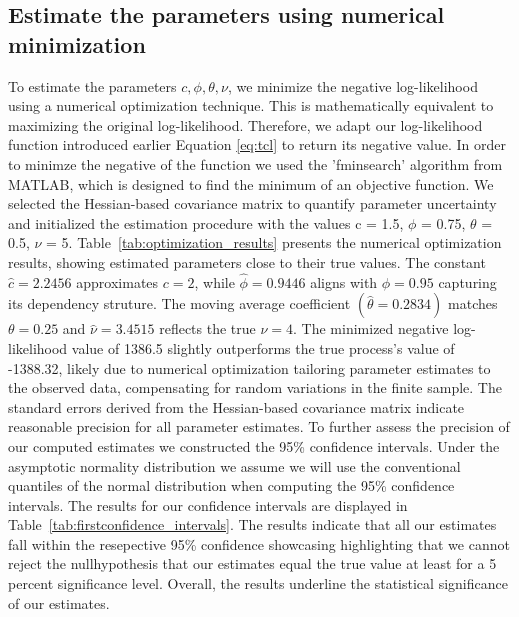 \documentclass[11pt]{article}
\begin{document}
\subsection{Estimate the parameters using numerical minimization}
To estimate the parameters $c, \phi, \theta, \nu$, we minimize the negative log-likelihood using a numerical optimization technique. This is mathematically equivalent to maximizing the original log-likelihood.
Therefore, we adapt our log-likelihood function introduced earlier Equation \eqref{eq:tcl} to return its negative value.
In order to minimze the negative of the function we used the 'fminsearch' algorithm from MATLAB, which is designed to find the minimum of an objective function. 
We selected the Hessian-based covariance matrix to quantify parameter uncertainty and initialized the estimation procedure with the values c = 1.5, $\phi$ = 0.75, $\theta$ = 0.5, $\nu$ = 5.
Table~\ref{tab:optimization_results} presents the numerical optimization results, showing estimated parameters close to their true values.
The constant \(\hat{c} = 2.2456\) approximates \(c = 2\), while \(\hat{\phi}
= 0.9446\) 
aligns with \(\phi = 0.95\) capturing its dependency struture. The moving average coefficient $(\hat{\theta} = 0.2834)$ matches \(\theta = 0.25\) and \(\hat{\nu} = 3.4515\) reflects the true \(\nu = 4\).
The minimized negative log-likelihood value of 1386.5 slightly outperforms the true process's value of -1388.32, likely due to numerical optimization tailoring parameter estimates to the observed data, compensating for random variations in the finite sample.
The standard errors derived from the Hessian-based covariance matrix indicate reasonable precision for all parameter estimates.
To further assess the precision of our computed estimates we constructed the 95\% confidence intervals.
Under the asymptotic normality distribution we assume we will use the conventional quantiles of the normal distribution when computing the 95\% confidence intervals.
The results for our confidence intervals are displayed in Table~\ref{tab:firstconfidence_intervals}.
The results indicate that all our estimates fall within the resepective 95\% confidence showcasing highlighting that we cannot reject the nullhypothesis that our estimates equal the true value at least for a 5 percent significance level.
Overall, the results underline the statistical significance of our estimates.
\end{document}
